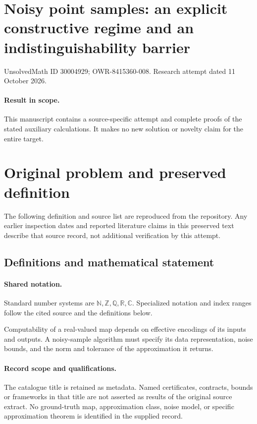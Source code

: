 \documentclass[11pt]{article}
\begin{document}
\section*{Noisy point samples: an explicit constructive regime and an indistinguishability barrier}
\noindent UnsolvedMath ID 30004929; OWR-8415360-008. Research attempt dated 11 October 2026.
\paragraph{Result in scope.}This manuscript contains a source-specific attempt and complete proofs of the stated auxiliary calculations. It makes no new solution or novelty claim for the entire target.
\section{Original problem and preserved definition}
The following definition and source list are reproduced from the repository. Any earlier inspection dates and reported literature claims in this preserved text describe that source record, not additional verification by this attempt.
\subsection{Definitions and mathematical statement}

\paragraph{Shared notation.}Standard number systems are $\mathbb N,\mathbb Z,\mathbb Q,\mathbb R,\mathbb C$. Specialized notation and index ranges follow the cited source and the definitions below.


Computability of a real-valued map depends on effective encodings of its inputs and outputs. A noisy-sample algorithm must specify its data representation, noise bounds, and the norm and tolerance of the approximation it returns.
\paragraph{Record scope and qualifications.}
The catalogue title is retained as metadata. Named certificates, contracts, bounds or frameworks in that title are not asserted as results of the original source extract.
No ground-truth map, approximation class, noise model, or specific approximation theorem is identified in the supplied record.
\end{document}
